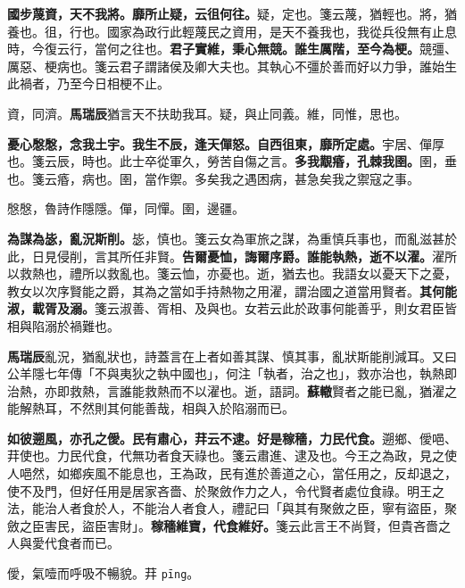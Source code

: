 \textbf{國步蔑資，天不我將。靡所止疑，云徂何往。}{\footnotesize 疑，定也。箋云蔑，猶輕也。將，猶養也。徂，行也。國家為政行此輕蔑民之資用，是天不養我也，我從兵役無有止息時，今復云行，當何之往也。}\textbf{君子實維，秉心無競。誰生厲階，至今為梗。}{\footnotesize 競彊、厲惡、梗病也。箋云君子謂諸侯及卿大夫也。其執心不彊於善而好以力爭，誰始生此禍者，乃至今日相梗不止。}

\begin{quoting}資，同濟。\textbf{馬瑞辰}猶言天不扶助我耳。疑，與止同義。維，同惟，思也。\end{quoting}

\textbf{憂心慇慇，念我土宇。我生不辰，逢天僤怒。自西徂東，靡所定處。}{\footnotesize 宇居、僤厚也。箋云辰，時也。此士卒從軍久，勞苦自傷之言。}\textbf{多我覯痻，孔棘我圉。}{\footnotesize 圉，垂也。箋云痻，病也。圉，當作禦。多矣我之遇困病，甚急矣我之禦寇之事。}

\begin{quoting}慇慇，魯詩作隱隱。僤，同憚。圉，邊疆。\end{quoting}

\textbf{為謀為毖，亂況斯削。}{\footnotesize 毖，慎也。箋云女為軍旅之謀，為重慎兵事也，而亂滋甚於此，日見侵削，言其所任非賢。}\textbf{告爾憂恤，誨爾序爵。誰能執熱，逝不以濯。}{\footnotesize 濯所以救熱也，禮所以救亂也。箋云恤，亦憂也。逝，猶去也。我語女以憂天下之憂，教女以次序賢能之爵，其為之當如手持熱物之用濯，謂治國之道當用賢者。}\textbf{其何能淑，載胥及溺。}{\footnotesize 箋云淑善、胥相、及與也。女若云此於政事何能善乎，則女君臣皆相與陷溺於禍難也。}

\begin{quoting}\textbf{馬瑞辰}亂況，猶亂狀也，詩蓋言在上者如善其謀、慎其事，亂狀斯能削減耳。又曰公羊隱七年傳「不與夷狄之執中國也」，何注「執者，治之也」，救亦治也，執熱即治熱，亦即救熱，言誰能救熱而不以濯也。逝，語詞。\textbf{蘇轍}賢者之能已亂，猶濯之能解熱耳，不然則其何能善哉，相與入於陷溺而已。\end{quoting}

\textbf{如彼遡風，亦孔之僾。民有肅心，荓云不逮。好是稼穡，力民代食。}{\footnotesize 遡鄉、僾唈、荓使也。力民代食，代無功者食天祿也。箋云肅進、逮及也。今王之為政，見之使人唈然，如鄉疾風不能息也，王為政，民有進於善道之心，當任用之，反却退之，使不及門，但好任用是居家吝嗇、於聚斂作力之人，令代賢者處位食祿。明王之法，能治人者食於人，不能治人者食人，禮記曰「與其有聚斂之臣，寧有盜臣，聚斂之臣害民，盜臣害財」。}\textbf{稼穡維寶，代食維好。}{\footnotesize 箋云此言王不尚賢，但貴吝嗇之人與愛代食者而已。}

\begin{quoting}僾，氣噎而呼吸不暢貌。荓 \texttt{pīng}。\end{quoting}

